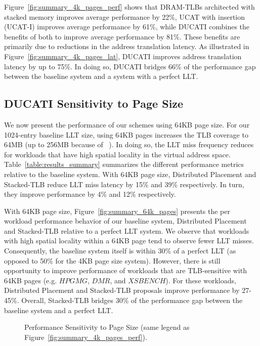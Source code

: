 Figure~\ref{fig:summary_4k_pages_perf} shows that DRAM-TLBs
architected with stacked memory improves average performance by 22\%,
UCAT with insertion (UCAT-I) improves average performance by 61\%,
while DUCATI combines the benefits of both to improve average
performance by 81\%. These benefits are primarily due to reductions in
the address translation latency. As illustrated in
Figure~\ref{fig:summary_4k_pages_lat}, DUCATI improves address
translation latency by up to 75\%. In doing so, DUCATI bridges 66\% of
the performance gap between the baseline system and a system with a
perfect LLT.



\subsection{DUCATI Sensitivity to Page Size}

\noindent We now present the performance of our schemes using 64KB
page size. For our 1024-entry baseline LLT size, using 64KB pages
increases the TLB coverage to 64MB (up to 256MB because of
~\cite{COLT}). In doing so, the LLT miss frequency reduces for
workloads that have high spatial locality in the virtual address
space. Table~\ref{table:results_summary} summarizes the different
performance metrics relative to the baseline system. With 64KB page
size, Distributed Placement and Stacked-TLB reduce LLT miss latency by
15\% and 39\% respectively. In turn, they improve performance by 4\%
and 12\% respectively.

With 64KB page size, Figure~\ref{fig:summary_64k_pages} presents the
per workload performance behavior of our baseline system, Distributed
Placement and Stacked-TLB relative to a perfect LLT system. We observe
that workloads with high spatial locality within a 64KB page tend to
observe fewer LLT misses. Consequently, the baseline system itself is
within 30\% of a perfect LLT (as opposed to 50\% for the 4KB page size
system). However, there is still opportunity to improve performance of
workloads that are TLB-sensitive with 64KB pages (e.g. $HPGMG$, $DMR$,
and $XSBENCH$). For these workloads, Distributed Placement and
Stacked-TLB proposals improve performance by 27-45\%. Overall,
Stacked-TLB bridges 30\% of the performance gap between the baseline
system and a perfect LLT.


\begin{figure}[tp] 
\vspace{0. in} \centering
\centerline{}

\caption{\small Performance Sensitivity to Page Size (same legend as
Figure~\ref{fig:summary_4k_pages_perf}). \normalsize}

\label{fig:summary_pagesize} 
\vspace{-0. in}
\end{figure}

